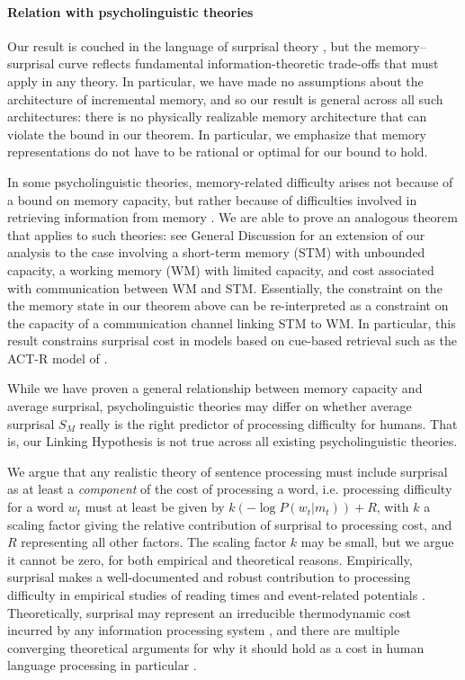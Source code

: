 \paragraph{Relation with psycholinguistic theories} 
Our result is couched in the language of surprisal theory \citep{hale2001probabilistic,levy2008expectation,hale2016information}, but the memory--surprisal curve reflects fundamental information-theoretic trade-offs that must apply in any theory. In particular, we have made no assumptions about the architecture of incremental memory, and so our result is general across all such architectures: there is no physically realizable memory architecture that can violate the bound in our theorem. In particular, we emphasize that memory representations do not have to be rational or optimal for our bound to hold.

In some psycholinguistic theories, memory-related difficulty arises not because of a bound on memory capacity, but rather because of difficulties involved in retrieving information from memory \citep{}. We are able to prove an analogous theorem that applies to such theories: see General Discussion for an extension of our analysis to the case involving a short-term memory (STM) with unbounded capacity, a working memory (WM) with limited capacity, and cost associated with communication between WM and STM. Essentially, the constraint on the the memory state in our theorem above can be re-interpreted as a constraint on the capacity of a communication channel linking STM to WM. In particular, this result constrains surprisal cost in models based on cue-based retrieval such as the ACT-R model of \citet{lewis-activation-based-2005}.

While we have proven a general relationship between memory capacity and average surprisal, psycholinguistic theories may differ on whether average surprisal $S_M$ really is the right predictor of processing difficulty for humans. That is, our Linking Hypothesis is not true across all existing psycholinguistic theories. 

We argue that any realistic theory of sentence processing must include surprisal as at least a \emph{component} of the cost of processing a word, i.e. processing difficulty for a word $w_t$ must at least be given by $k (-\log P(w_t |m_t)) + R$, with $k$ a scaling factor giving the relative contribution of surprisal to processing cost, and $R$ representing all other factors. The scaling factor $k$ may be small, but we argue it cannot be zero, for both empirical and theoretical reasons. Empirically, surprisal makes a well-documented and robust contribution to processing difficulty in empirical studies of reading times and event-related potentials \citep{smith2013effect,frank2016erp}. Theoretically, surprisal may represent an irreducible thermodynamic cost incurred by any information processing system \citep{brillouin,still2012thermodynamic,zenon2019information}, and there are multiple converging theoretical arguments for why it should hold as a cost in human language processing in particular \citep{levy2013memory}.

